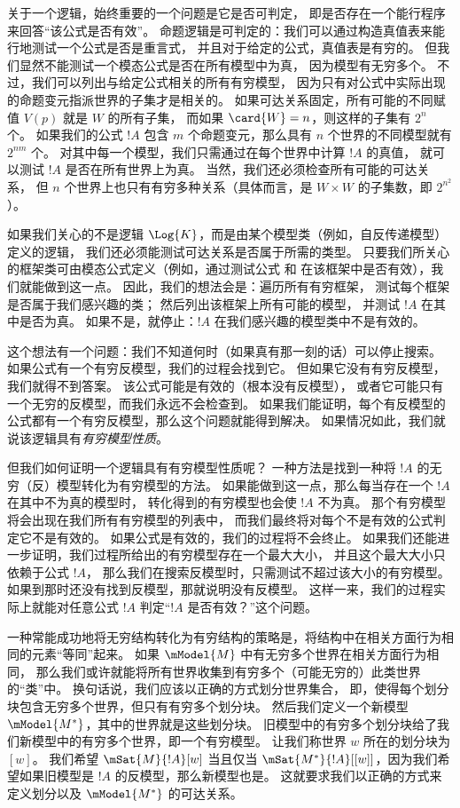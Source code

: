 \documentclass[../../../include/open-logic-section]{subfiles}
\begin{document}


关于一个逻辑，始终重要的一个问题是它是否可判定，
即是否存在一个能行程序来回答“该公式是否有效”。
命题逻辑是可判定的：我们可以通过构造真值表来能行地测试一个公式是否是重言式，
并且对于给定的公式，真值表是有穷的。
但我们显然不能测试一个模态公式是否在所有模型中为真，
因为模型有无穷多个。
不过，我们可以列出与给定公式相关的所有有穷模型，
因为只有对公式中实际出现的命题变元指派世界的子集才是相关的。
如果可达关系固定，所有可能的不同赋值 $V(p)$ 就是 $W$ 的所有子集，
而如果 $\card{W} = n$，则这样的子集有 $2^n$ 个。
如果我们的公式 $!A$ 包含 $m$ 个命题变元，那么具有 $n$ 个世界的不同模型就有 $2^{nm}$ 个。
对其中每一个模型，我们只需通过在每个世界中计算 $!A$ 的真值，
就可以测试 $!A$ 是否在所有世界上为真。
当然，我们还必须检查所有可能的可达关系，
但 $n$ 个世界上也只有有穷多种关系（具体而言，是 $W \times W$ 的子集数，即 $2^{n^2}$）。

如果我们关心的不是逻辑 $\Log{K}$，而是由某个模型类（例如，自反传递模型）定义的逻辑，
我们还必须能测试可达关系是否属于所需的类型。
只要我们所关心的框架类可由模态公式定义（例如，通过测试公式  和  在该框架中是否有效），我们就能做到这一点。
因此，我们的想法会是：遍历所有有穷框架，
测试每个框架是否属于我们感兴趣的类；
然后列出该框架上所有可能的模型，
并测试 $!A$ 在其中是否为真。
如果不是，就停止：$!A$ 在我们感兴趣的模型类中不是有效的。

这个想法有一个问题：我们不知道何时（如果真有那一刻的话）可以停止搜索。
如果公式有一个有穷反模型，我们的过程会找到它。
但如果它没有有穷反模型，我们就得不到答案。
该公式可能是有效的（根本没有反模型），
或者它可能只有一个无穷的反模型，而我们永远不会检查到。
如果我们能证明，每个有反模型的公式都有一个有穷反模型，那么这个问题就能得到解决。
如果情况如此，我们就说该逻辑具有\emph{有穷模型性质}。

但我们如何证明一个逻辑具有有穷模型性质呢？
一种方法是找到一种将 $!A$ 的无穷（反）模型转化为有穷模型的方法。
如果能做到这一点，那么每当存在一个 $!A$ 在其中不为真的模型时，
转化得到的有穷模型也会使 $!A$ 不为真。
那个有穷模型将会出现在我们所有有穷模型的列表中，
而我们最终将对每个不是有效的公式判定它不是有效的。
如果公式是有效的，我们的过程将不会终止。
如果我们还能进一步证明，我们过程所给出的有穷模型存在一个最大大小，
并且这个最大大小只依赖于公式 $!A$，
那么我们在搜索反模型时，只需测试不超过该大小的有穷模型。
如果到那时还没有找到反模型，那就说明没有反模型。
这样一来，我们的过程实际上就能对任意公式 $!A$ 判定“$!A$ 是否有效？”这个问题。

一种常能成功地将无穷结构转化为有穷结构的策略是，将结构中在相关方面行为相同的元素“等同”起来。
如果 $\mModel{M}$ 中有无穷多个世界在相关方面行为相同，
那么我们或许就能将所有世界收集到有穷多个（可能无穷的）此类世界的“类”中。
换句话说，我们应该以正确的方式划分世界集合，
即，使得每个划分块包含无穷多个世界，但只有有穷多个划分块。
然后我们定义一个新模型 $\mModel{M^*}$，其中的世界就是这些划分块。
旧模型中的有穷多个划分块给了我们新模型中的有穷多个世界，即一个有穷模型。
让我们称世界 $w$ 所在的划分块为 $[w]$。
我们希望 $\mSat{M}{!A}[w]$ 当且仅当
$\mSat{M^*}{!A}[{[w]}]$，因为我们希望如果旧模型是 $!A$ 的反模型，那么新模型也是。
这就要求我们以正确的方式来定义划分以及 $\mModel{M^*}$ 的可达关系。
\end{document}
